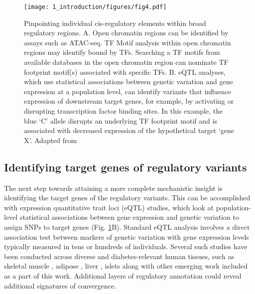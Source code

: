 \begin{figure}
        \centering
        \texttt{[image: 1\_introduction/figures/fig4.pdf]}
        \caption{Pinpointing individual cis-regulatory elements within broad regulatory regions. A. Open chromatin regions can be identified by assays such as ATAC-seq. TF Motif analysis within open chromatin regions may identify bound by TFs. Searching a TF motifs from available databases in the open chromatin region can nominate TF footprint motif(s) associated with specific TFs. B. eQTL analyses, which use statistical associations between genetic variation and gene expression at a population level, can identify variants that influence expression of downstream target genes, for example, by activating or disrupting transcription factor binding sites. In this example, the blue ‘C’ allele disrupts an underlying TF footprint motif and is associated with decreased expression of the hypothetical target ‘gene X’. Adapted from \cite{kyonoGenomicAnnotationDiseaseassociated2019}}
        \label{fig:ci_f4}
\end{figure}


\subsection{Identifying target genes of regulatory variants}
The next step towards attaining a more complete mechanistic insight is identifying the target genes of the regulatory variants. This can be accomplished with expression quantitative trait loci (eQTL) studies, which look at population-level statistical associations between gene expression and genetic variation to assign SNPs to target genes (Fig. \ref{fig:ci_f4}B). Standard eQTL analysis involves a direct association test between markers of genetic variation with gene expression levels typically measured in tens or hundreds of individuals. Several such studies have been conducted across diverse and diabetes-relevant human tissues, such as skeletal muscle \cite{scottGeneticRegulatorySignature2016}, adipose \cite{civelekGeneticRegulationAdipose2017}, liver \cite{gtexconsortiumGeneticEffectsGene2017} , islets \cite{fadistaGlobalGenomicTranscriptomic2014, buntTranscriptExpressionData2015, varshneyGeneticRegulatorySignatures2017} along with other emerging work included as a part of this work. Additional layers of regulatory annotation could reveal additional signatures of convergence.


